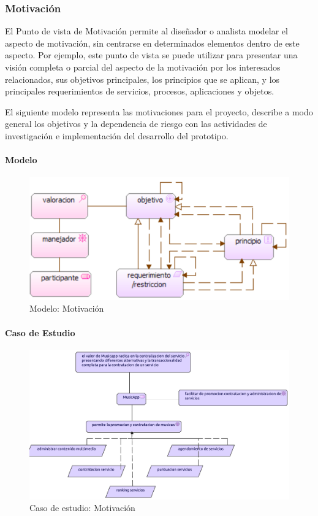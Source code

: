 \newpage

\subsubsection{Motivación}
El Punto de vista de Motivación permite al diseñador o analista modelar el aspecto de motivación, sin centrarse en determinados elementos dentro de este aspecto. Por ejemplo, este punto de vista se puede utilizar para presentar una visión completa o parcial del aspecto de la motivación por los interesados relacionados, sus objetivos principales, los principios que se aplican, y los principales requerimientos de servicios, procesos, aplicaciones y objetos.  \vspace{\baselineskip}

El siguiente modelo representa las motivaciones para el proyecto, describe a modo general los objetivos y la dependencia de riesgo con las actividades de investigación e implementación del desarrollo del prototipo.

\paragraph{Modelo}
\begin{figure}[h!]
	\centering
	\includegraphics[width=0.8\linewidth]{Desarrollo/ArquitecturaEmpresarial/Motivacion/imgs/MotivacionMetamodelo.PNG}
	\caption{Modelo:  Motivación}
\end{figure}
\newpage
\paragraph{Caso de Estudio}
\begin{figure}[h!]
	\centering
	\includegraphics[width=\linewidth]{Desarrollo/ArquitecturaEmpresarial/Motivacion/imgs/Motivacion.pdf}
	\caption{Caso de estudio: Motivación}
	\label{fig:comportamiento}
\end{figure}

\newpage

